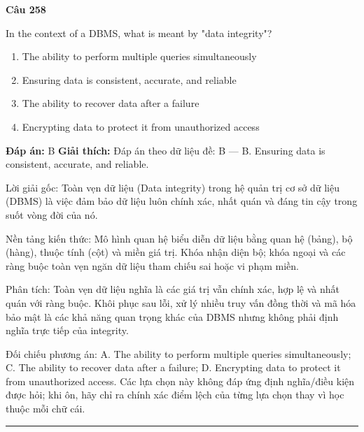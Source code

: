 \documentclass[11pt,a4paper]{article}
\newenvironment{question}[1]{%
  \par\vspace{1em}\noindent\textbf{\large Câu #1}\par\vspace{0.4em}
}{%
  \par\vspace{1em}\hrule\vspace{0.6em}
}
\newenvironment{choices}{%
  \begin{enumerate}[label=\textbf{\Alph*.},leftmargin=2.2em,itemsep=2pt,topsep=3pt]
}{%
  \end{enumerate}
}
\newcommand{\choice}{\item}
\begin{document}
\begin{question}{258}
In the context of a DBMS, what is meant by "data integrity"?
\begin{choices}
\choice The ability to perform multiple queries simultaneously
\choice Ensuring data is consistent, accurate, and reliable
\choice The ability to recover data after a failure
\choice Encrypting data to protect it from unauthorized access
\end{choices}
\textbf{Đáp án:} B
\textbf{Giải thích:} Đáp án theo dữ liệu đề: B — B. Ensuring data is consistent, accurate, and reliable.

Lời giải gốc: Toàn vẹn dữ liệu (Data integrity) trong hệ quản trị cơ sở dữ liệu (DBMS) là việc đảm bảo dữ liệu luôn chính xác, nhất quán và đáng tin cậy trong suốt vòng đời của nó.

Nền tảng kiến thức: Mô hình quan hệ biểu diễn dữ liệu bằng quan hệ (bảng), bộ (hàng), thuộc tính (cột) và miền giá trị. Khóa nhận diện bộ; khóa ngoại và các ràng buộc toàn vẹn ngăn dữ liệu tham chiếu sai hoặc vi phạm miền.

Phân tích: Toàn vẹn dữ liệu nghĩa là các giá trị vẫn chính xác, hợp lệ và nhất quán với ràng buộc. Khôi phục sau lỗi, xử lý nhiều truy vấn đồng thời và mã hóa bảo mật là các khả năng quan trọng khác của DBMS nhưng không phải định nghĩa trực tiếp của integrity.

Đối chiếu phương án: A. The ability to perform multiple queries simultaneously; C. The ability to recover data after a failure; D. Encrypting data to protect it from unauthorized access. Các lựa chọn này không đáp ứng định nghĩa/điều kiện được hỏi; khi ôn, hãy chỉ ra chính xác điểm lệch của từng lựa chọn thay vì học thuộc mỗi chữ cái.
\end{question}
\end{document}
